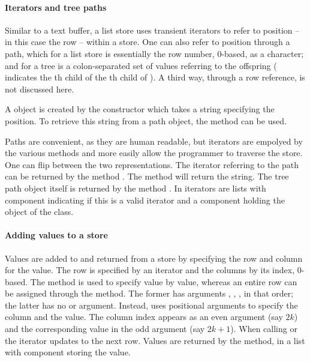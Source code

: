 \paragraph{Iterators and tree paths}
Similar to a text buffer, a list store uses transient iterators to
refer to position -- in this case the row -- within a store. One can
also refer to position through a path, which for a list store is
essentially the row number, $0$-based, as a character; and for a tree
is a colon-separated set of values referring to the offspring
( indicates the th child of the th child
of ).  A third way, through a row reference, is not discussed
here.

A  object is created by the constructor
 which takes a string specifying the
position. To retrieve this string from a path object, the
 method can be used.

Paths are convenient, as they are human readable, but iterators are
empolyed by the various methods and more easily allow the programmer
to traverse the store. One can flip between the two
representations. The iterator referring to the path can be returned by
the method . The method
 will return the string. The
tree path object itself is returned by the method
.  In  iterators are lists
with component  indicating if this is a valid iterator
and a component  holding the object of the
 class.

\paragraph{Adding values to a store}
Values are added to and returned from a store by specifying the row
and column for the value. The row is specified by an iterator and the
columns by its index, $0$-based.  The method
 is used to specify value by value,
whereas an entire row can be assigned through the
 method. The former has arguments
, , , in that order; the latter
has no  or  argument. Instead, 
uses positional arguments to specify the column and the value. The
column index appears as an even argument (say $2k$) and the
corresponding value in the odd argument (say $2k+1$).  When calling
 or  the iterator updates to the next row.
Values are returned by the  method, in
a list with component  storing the value.

